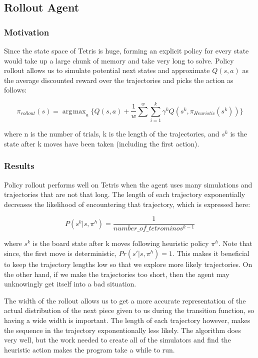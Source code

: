 \documentclass{article}
\DeclareMathOperator*{\argmax}{arg\!\max}
\begin{document}
\subsection{Rollout Agent}
\subsubsection{Motivation}
Since the state space of Tetris is huge, forming an explicit policy for every state would take up a large chunk of memory and take very long to solve. Policy rollout allows us to simulate potential next states and approximate $Q(s,a)$ as the average discounted reward over the trajectories and picks the action as follows:

\begin{equation} \label{rollout}
\pi_{rollout}(s) = \argmax_a \{ Q(s,a) + \dfrac{1}{w}\displaystyle\sum^{w}\displaystyle\sum_{i=1}^{k} \gamma^{k}Q(s^{k}, \pi_{Heuristic}(s^{k}))\}
\end{equation}

where n is the number of trials, k is the length of the trajectories, and $s^{k}$ is the state after k moves have been taken (including the first action).

\subsubsection{Results}
Policy rollout performs well on Tetris when the agent uses many simulations and trajectories that are not that long. The length of each trajectory exponentially decreases the likelihood of encountering that trajectory, which is expressed here:

\begin{equation} \label{probtraj}
P(s^{k}|s,\pi^h) = \dfrac{1}{number\_of\_tetrominos^{k - 1}}
\end{equation}

where $s^{k}$ is the board state after k moves following heuristic policy $\pi^h$. Note that since, the first move is deterministic, $Pr(s'|s,\pi^h) = 1$. This makes it beneficial to keep the trajectory lengths low so that we explore more likely trajectories. On the other hand, if we make the trajectories too short, then the agent may unknowingly get itself into a bad situation.

The width of the rollout allows us to get a more accurate representation of the actual distribution of the next piece given to us during the transition function, so having a wide width is important. The length of each trajectory however, makes the sequence in the trajectory exponentionally less likely. The algorithm does very well, but the work needed to create all of the simulators and find the heuristic action makes the program take a while to run.
\end{document}
